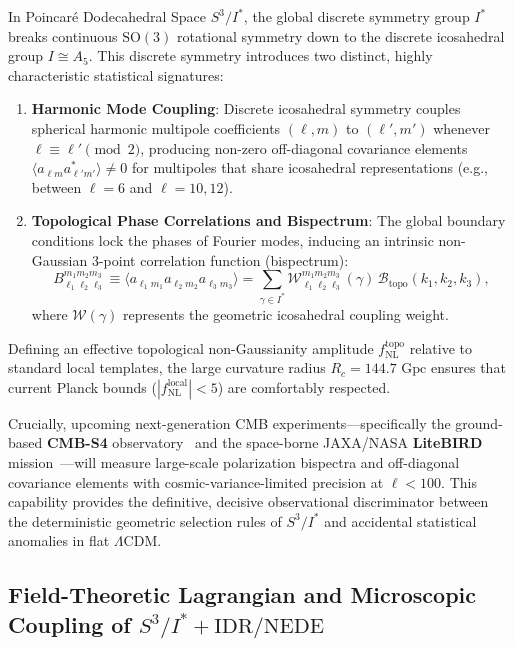 \documentclass[11pt,a4paper]{article}
\theoremstyle{definition}
\newcommand{\SO}{\mathrm{SO}}
\newcommand{\LCDM}{\Lambda\mathrm{CDM}}
\newcommand{\NEDE}{\mathrm{NEDE}}
\newcommand{\IDR}{\mathrm{IDR}}
\begin{document}
In Poincar\'e Dodecahedral Space $S^3 / I^*$, the global discrete symmetry group $I^*$ breaks continuous $\SO(3)$ rotational symmetry down to the discrete icosahedral group $I \cong A_5$. This discrete symmetry introduces two distinct, highly characteristic statistical signatures:
\begin{enumerate}
    \item \textbf{Harmonic Mode Coupling}: Discrete icosahedral symmetry couples spherical harmonic multipole coefficients $(\ell, m)$ to $(\ell', m')$ whenever $\ell \equiv \ell' \pmod 2$, producing non-zero off-diagonal covariance elements $\langle a_{\ell m} a_{\ell' m'}^* \rangle \neq 0$ for multipoles that share icosahedral representations (e.g., between $\ell = 6$ and $\ell = 10, 12$).
    \item \textbf{Topological Phase Correlations and Bispectrum}: The global boundary conditions lock the phases of Fourier modes, inducing an intrinsic non-Gaussian 3-point correlation function (bispectrum):
    \begin{equation}
    B_{\ell_1 \ell_2 \ell_3}^{m_1 m_2 m_3} \equiv \langle a_{\ell_1 m_1} a_{\ell_2 m_2} a_{\ell_3 m_3} \rangle = \sum_{\gamma \in I^*} \mathcal{W}_{\ell_1 \ell_2 \ell_3}^{m_1 m_2 m_3}(\gamma) \, \mathcal{B}_{\mathrm{topo}}(k_1, k_2, k_3),
    \end{equation}
    where $\mathcal{W}(\gamma)$ represents the geometric icosahedral coupling weight.
\end{enumerate}
Defining an effective topological non-Gaussianity amplitude $f_{\mathrm{NL}}^{\mathrm{topo}}$ relative to standard local templates, the large curvature radius $R_c = 144.7\text{ Gpc}$ ensures that current Planck bounds ($|f_{\mathrm{NL}}^{\mathrm{local}}| < 5$) are comfortably respected.

Crucially, upcoming next-generation CMB experiments—specifically the ground-based \textbf{CMB-S4} observatory~\cite{Abazajian2019} and the space-borne JAXA/NASA \textbf{LiteBIRD} mission~\cite{LiteBIRD2020}—will measure large-scale polarization bispectra and off-diagonal covariance elements with cosmic-variance-limited precision at $\ell < 100$. This capability provides the definitive, decisive observational discriminator between the deterministic geometric selection rules of $S^3 / I^*$ and accidental statistical anomalies in flat $\LCDM$.

\subsection{Field-Theoretic Lagrangian and Microscopic Coupling of $S^3/I^* + \IDR/\NEDE$}
\end{document}
